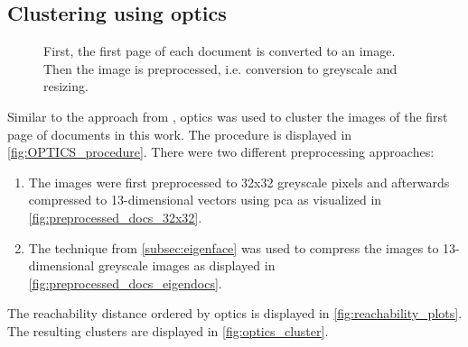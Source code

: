 \subsection{Clustering using \ac{optics}}\label{subsec:impl-optics}

\begin{figure}[htp] %
    \centering
    
    \caption{First, the first page of each document is converted to an image.
    Then the image is preprocessed, i.e. conversion to greyscale and resizing.
    }
    \label{fig:OPTICS_procedure}
\end{figure}

Similar to the approach from \cite{OPTICS1999}, \ac{optics} was used to cluster the images of the first page of documents in this work.
The procedure is displayed in \autoref{fig:OPTICS_procedure}.
There were two different preprocessing approaches:
\begin{enumerate}
    \item \label{pt:32}The images were first preprocessed to 32x32 greyscale pixels and afterwards compressed to 13-dimensional vectors using \ac{pca} as visualized in \autoref{fig:preprocessed_docs_32x32}.
    \item \label{pt:eigendocs}The technique \eigendocs{} from \autoref{subsec:eigenface} 
    was used to compress the images to 13-dimensional greyscale images as displayed in \autoref{fig:preprocessed_docs_eigendocs}.
\end{enumerate}

The reachability distance ordered by \ac{optics} is displayed in \autoref{fig:reachability_plots}.
The resulting clusters are displayed in \autoref{fig:optics_cluster}.



